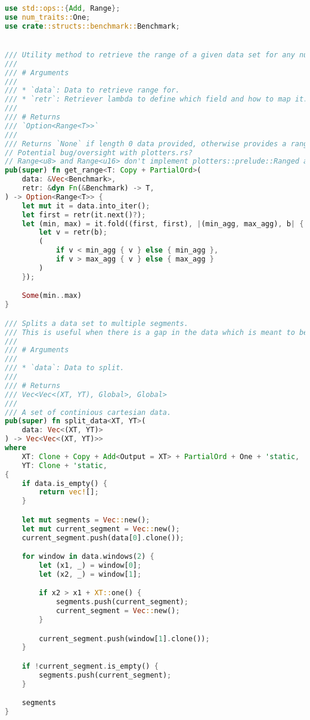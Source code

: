 \begin{lstlisting}[language=rust, caption={graphing/utils.rs}]
use std::ops::{Add, Range};
use num_traits::One;
use crate::structs::benchmark::Benchmark;


/// Utility method to retrieve the range of a given data set for any numerical data.
///
/// # Arguments
///
/// * `data`: Data to retrieve range for.
/// * `retr`: Retriever lambda to define which field and how to map it.
///
/// # Returns
/// `Option<Range<T>>`
///
/// Returns `None` if length 0 data provided, otherwise provides a range of the retrieved data type.
// Potential bug/oversight with plotters.rs?
// Range<u8> and Range<u16> don't implement plotters::prelude::Ranged as expected?
pub(super) fn get_range<T: Copy + PartialOrd>(
	data: &Vec<Benchmark>,
	retr: &dyn Fn(&Benchmark) -> T,
) -> Option<Range<T>> {
	let mut it = data.into_iter();
	let first = retr(it.next()?);
	let (min, max) = it.fold((first, first), |(min_agg, max_agg), b| {
		let v = retr(b);
		(
			if v < min_agg { v } else { min_agg },
			if v > max_agg { v } else { max_agg }
		)
	});

	Some(min..max)
}

/// Splits a data set to multiple segments.
/// This is useful when there is a gap in the data which is meant to be rendered as disjoint.
///
/// # Arguments
///
/// * `data`: Data to split.
///
/// # Returns
/// Vec<Vec<(XT, YT), Global>, Global>
///
/// A set of continious cartesian data.
pub(super) fn split_data<XT, YT>(
	data: Vec<(XT, YT)>
) -> Vec<Vec<(XT, YT)>>
where
	XT: Clone + Copy + Add<Output = XT> + PartialOrd + One + 'static,
	YT: Clone + 'static,
{
	if data.is_empty() {
		return vec![];
	}

	let mut segments = Vec::new();
	let mut current_segment = Vec::new();
	current_segment.push(data[0].clone());

	for window in data.windows(2) {
		let (x1, _) = window[0];
		let (x2, _) = window[1];

		if x2 > x1 + XT::one() {
			segments.push(current_segment);
			current_segment = Vec::new();
		}

		current_segment.push(window[1].clone());
	}

	if !current_segment.is_empty() {
		segments.push(current_segment);
	}

	segments
}
\end{lstlisting}

